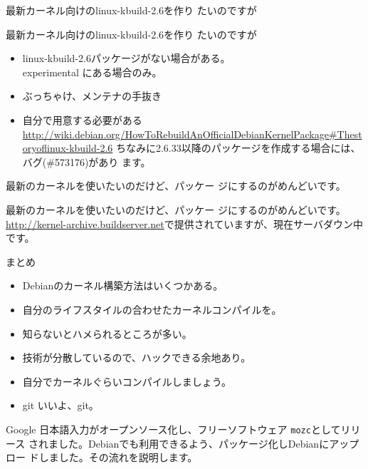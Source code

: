 \begin{frame}[containsverbatim]{最新カーネル向けのlinux-kbuild-2.6を作り
 たいのですが}
\end{frame}

\begin{frame}[containsverbatim]{最新カーネル向けのlinux-kbuild-2.6を作り
 たいのですが}

\begin{itemize}
\item linux-kbuild-2.6パッケージがない場合がある。\\
experimental にある場合のみ。
\item ぶっちゃけ、メンテナの手抜き
\item 自分で用意する必要がある\\
\url{http://wiki.debian.org/HowToRebuildAnOfficialDebianKernelPackage#Thestoryoflinux-kbuild-2.6}
ちなみに2.6.33以降のパッケージを作成する場合には、 バグ(\#573176)があり
      ます。
\end{itemize}
\end{frame}


\begin{frame}[containsverbatim]{最新のカーネルを使いたいのだけど、パッケー
 ジにするのがめんどいです。}
\end{frame}

\begin{frame}[containsverbatim]{最新のカーネルを使いたいのだけど、パッケー
 ジにするのがめんどいです。}
\url{http://kernel-archive.buildserver.net}で提供されていますが、現在サーバダウン中です。
\end{frame}


\begin{frame}[containsverbatim]{まとめ}
\begin{itemize}
\item Debianのカーネル構築方法はいくつかある。
\item 自分のライフスタイルの合わせたカーネルコンパイルを。
\item 知らないとハメられるところが多い。
\item 技術が分散しているので、ハックできる余地あり。
\item 自分でカーネルぐらいコンパイルしましょう。
\item git いいよ、git。
\end{itemize}

\end{frame}


\begin{frame}
Google 日本語入力がオープンソース化し、フリーソフトウェア \texttt{mozc}としてリリース
されました。Debianでも利用できるよう、パッケージ化しDebianにアップロー
ドしました。その流れを説明します。
\end{frame}

